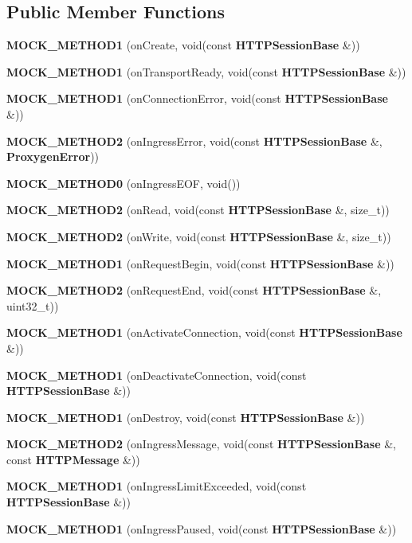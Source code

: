 \subsection*{Public Member Functions}
\begin{DoxyCompactItemize}
\item 
{\bf M\+O\+C\+K\+\_\+\+M\+E\+T\+H\+O\+D1} (on\+Create, void(const {\bf H\+T\+T\+P\+Session\+Base} \&))
\item 
{\bf M\+O\+C\+K\+\_\+\+M\+E\+T\+H\+O\+D1} (on\+Transport\+Ready, void(const {\bf H\+T\+T\+P\+Session\+Base} \&))
\item 
{\bf M\+O\+C\+K\+\_\+\+M\+E\+T\+H\+O\+D1} (on\+Connection\+Error, void(const {\bf H\+T\+T\+P\+Session\+Base} \&))
\item 
{\bf M\+O\+C\+K\+\_\+\+M\+E\+T\+H\+O\+D2} (on\+Ingress\+Error, void(const {\bf H\+T\+T\+P\+Session\+Base} \&, {\bf Proxygen\+Error}))
\item 
{\bf M\+O\+C\+K\+\_\+\+M\+E\+T\+H\+O\+D0} (on\+Ingress\+E\+OF, void())
\item 
{\bf M\+O\+C\+K\+\_\+\+M\+E\+T\+H\+O\+D2} (on\+Read, void(const {\bf H\+T\+T\+P\+Session\+Base} \&, size\+\_\+t))
\item 
{\bf M\+O\+C\+K\+\_\+\+M\+E\+T\+H\+O\+D2} (on\+Write, void(const {\bf H\+T\+T\+P\+Session\+Base} \&, size\+\_\+t))
\item 
{\bf M\+O\+C\+K\+\_\+\+M\+E\+T\+H\+O\+D1} (on\+Request\+Begin, void(const {\bf H\+T\+T\+P\+Session\+Base} \&))
\item 
{\bf M\+O\+C\+K\+\_\+\+M\+E\+T\+H\+O\+D2} (on\+Request\+End, void(const {\bf H\+T\+T\+P\+Session\+Base} \&, uint32\+\_\+t))
\item 
{\bf M\+O\+C\+K\+\_\+\+M\+E\+T\+H\+O\+D1} (on\+Activate\+Connection, void(const {\bf H\+T\+T\+P\+Session\+Base} \&))
\item 
{\bf M\+O\+C\+K\+\_\+\+M\+E\+T\+H\+O\+D1} (on\+Deactivate\+Connection, void(const {\bf H\+T\+T\+P\+Session\+Base} \&))
\item 
{\bf M\+O\+C\+K\+\_\+\+M\+E\+T\+H\+O\+D1} (on\+Destroy, void(const {\bf H\+T\+T\+P\+Session\+Base} \&))
\item 
{\bf M\+O\+C\+K\+\_\+\+M\+E\+T\+H\+O\+D2} (on\+Ingress\+Message, void(const {\bf H\+T\+T\+P\+Session\+Base} \&, const {\bf H\+T\+T\+P\+Message} \&))
\item 
{\bf M\+O\+C\+K\+\_\+\+M\+E\+T\+H\+O\+D1} (on\+Ingress\+Limit\+Exceeded, void(const {\bf H\+T\+T\+P\+Session\+Base} \&))
\item 
{\bf M\+O\+C\+K\+\_\+\+M\+E\+T\+H\+O\+D1} (on\+Ingress\+Paused, void(const {\bf H\+T\+T\+P\+Session\+Base} \&))

\end{DoxyCompactItemize}
